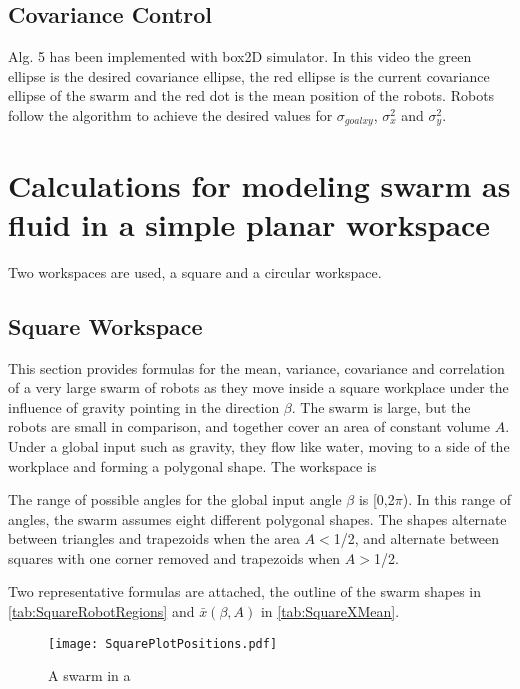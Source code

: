 \documentclass[conference]{IEEEtran}
\begin{document}
\subsection{Covariance Control}
Alg. 5 has been implemented with box2D simulator. In this video the green ellipse is the desired covariance ellipse, the red ellipse is the current covariance ellipse of the swarm and the red dot is the mean position of the robots. Robots follow the algorithm to achieve the desired values for $\sigma_{goalxy}$, $\sigma_x^2$ and $\sigma_y^2$.

\section{Calculations for modeling swarm as fluid in a simple planar workspace}
Two workspaces are used, a square and a circular workspace.

\subsection{Square Workspace}
This section provides formulas for the mean, variance,  covariance and correlation of a very large swarm of robots as they move inside a square workplace under the influence of gravity pointing in the direction $\beta$. The swarm is large, but the robots are small in comparison, and together cover an area of constant volume $A$. Under a global input such as gravity, they flow like water, moving to a side of the workplace and forming a polygonal shape. The workspace is 

The range of possible angles for the global input angle $\beta $ is [0,2$\pi $). In this range of angles, the swarm assumes eight different polygonal shapes. The shapes alternate between triangles and trapezoids when the area $A$$<$1/2, and alternate between squares with one corner removed and trapezoids when $A$$>$1/2.

Two representative formulas are attached, the outline of the swarm shapes in \eqref{tab:SquareRobotRegions} and $\bar{x}(\beta,A)$ in \eqref{tab:SquareXMean}.




\begin{figure}[h]
\begin{center}
\texttt{[image: SquarePlotPositions.pdf]} 
\caption{A swarm in a }
\label{fig:friction}
\end{center}
\end{figure} 
\end{document}
